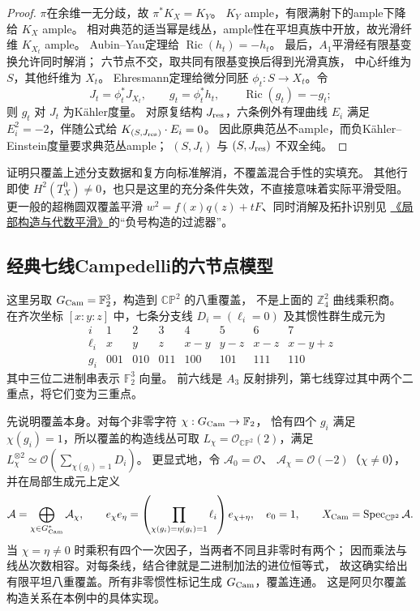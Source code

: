 \documentclass[UTF8,a4paper,11pt,fontset=fandol]{ctexart}
\numberwithin{equation}{section}
\theoremstyle{definition}
\newcommand{\Ric}{\operatorname{Ric}}
\newcommand{\CP}{\mathbb{CP}}
\newcommand{\Z}{\mathbb Z}
\begin{document}
\begin{proof}
$\pi$在余维一无分歧，故 $\pi^*K_X=K_Y$。
$K_Y$ ample，有限满射下的ample下降给 $K_X$ ample。
相对典范的适当幂是线丛，ample性在平坦真族中开放，故光滑纤维 $K_{X_t}$ ample。
Aubin--Yau定理给 $\Ric(h_t)=-h_t$。
最后，$A_1$平滑经有限基变换允许同时解消；
六节点不交，取共同有限基变换后得到光滑真族，
中心纤维为 $S$，其他纤维为 $X_t$。
Ehresmann定理给微分同胚 $\phi_t:S\to X_t$。令
\begin{equation}\label{eq:bcgp-pullback-ke}
J_t=\phi_t^*J_{X_t},\qquad g_t=\phi_t^*h_t,
\qquad \Ric(g_t)=-g_t;
\end{equation}
则 $g_t$ 对 $J_t$ 为K\"ahler度量。
对原复结构 $J_{\rm res}$，六条例外有理曲线 $E_i$ 满足
$E_i^2=-2$，伴随公式给 $K_{(S,J_{\rm res})}\cdot E_i=0$。
因此原典范丛不ample，而负K\"ahler--Einstein度量要求典范丛ample；
$(S,J_t)$ 与 $(S,J_{\rm res})$ 不双全纯。
\end{proof}

证明只覆盖上述分支数据和复方向标准解消，不覆盖混合手性的实填充。
其他行即使 $H^2(T_X^0)\ne0$，也只是这里的充分条件失效，不直接意味着实际平滑受阻。
更一般的超椭圆双覆盖平滑
$w^2=f(x)q(z)+tF$、同时消解及拓扑识别见
\href{20260912.tex}{《局部构造与代数平滑》}的“负号构造的过滤器”。

\subsection{经典七线Campedelli的六节点模型}\label{sec:campedelli-seven-lines}
这里另取 $G_{\rm Cam}=\mathbb F_2^3$，构造到 $\CP^2$ 的八重覆盖，
不是上面的 $\Z_4^2$ 曲线乘积商。
在齐次坐标 $[x:y:z]$ 中，七条分支线 $D_i=(\ell_i=0)$ 及其惯性群生成元为
\begin{equation}\label{eq:campedelli-lines}
\begin{array}{c|rrrrrrr}
i&1&2&3&4&5&6&7\\ \hline
\ell_i&x&y&z&x-y&y-z&x-z&x-y+z\\
g_i&001&010&011&100&101&111&110
\end{array}
\end{equation}
其中三位二进制串表示 $\mathbb F_2^3$ 向量。
前六线是 $A_3$ 反射排列，第七线穿过其中两个二重点，将它们变为三重点。

先说明覆盖本身。对每个非零字符 $\chi:G_{\rm Cam}\to\mathbb F_2$，
恰有四个 $g_i$ 满足 $\chi(g_i)=1$，所以覆盖的构造线丛可取
$L_\chi=\mathcal O_{\CP^2}(2)$，满足
$L_\chi^{\otimes2}\simeq\mathcal O(\sum_{\chi(g_i)=1}D_i)$。
更显式地，令 $\mathcal A_0=\mathcal O$、
$\mathcal A_\chi=\mathcal O(-2)$（$\chi\ne0$），并在局部生成元上定义
\begin{equation}\label{eq:campedelli-cover-algebra}
\mathcal A=\bigoplus_{\chi\in G_{\rm Cam}^*}\mathcal A_\chi,
\qquad
e_\chi e_\eta=
\left(\prod_{\chi(g_i)=\eta(g_i)=1}\ell_i\right)e_{\chi+\eta},
\quad e_0=1,
\qquad X_{\rm Cam}=\operatorname{Spec}_{\CP^2}\mathcal A.
\end{equation}
当 $\chi=\eta\ne0$ 时乘积有四个一次因子，当两者不同且非零时有两个；
因而乘法与线丛次数相容。对每条线，结合律就是二进制加法的进位恒等式，
故这确实给出有限平坦八重覆盖。所有非零惯性标记生成 $G_{\rm Cam}$，覆盖连通。
这是阿贝尔覆盖构造关系在本例中的具体实现\cite[\S2.2]{AlexeevPardini}。
\end{document}
